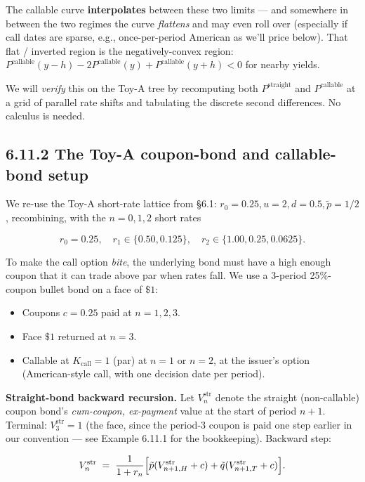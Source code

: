 \documentclass[
  10pt,
  twoside]{book}
\providecommand{\tightlist}{%
  \setlength{\itemsep}{0pt}\setlength{\parskip}{0pt}}
\begin{document}
The callable curve \textbf{interpolates} between these two limits ---
and somewhere in between the two regimes the curve \emph{flattens} and
may even roll over (especially if call dates are sparse, e.g.,
once-per-period American as we'll price below). That flat / inverted
region is the negatively-convex region:
\(P^{\text{callable}}(y - h) - 2 P^{\text{callable}}(y) + P^{\text{callable}}(y + h) < 0\)
for nearby yields.

We will \emph{verify} this on the Toy-A tree by recomputing both
\(P^{\text{straight}}\) and \(P^{\text{callable}}\) at a grid of
parallel rate shifts and tabulating the discrete second differences. No
calculus is needed.

\subsection{6.11.2 The Toy-A coupon-bond and callable-bond
setup}\label{the-toy-a-coupon-bond-and-callable-bond-setup}

We re-use the Toy-A short-rate lattice from §6.1:
\(r_0 = 0.25, u = 2, d = 0.5, \tilde p = 1/2\), recombining, with the
\(n=0,1,2\) short rates

\[r_0 = 0.25, \quad r_1 \in \{0.50, 0.125\}, \quad r_2 \in \{1.00, 0.25, 0.0625\}.\]

To make the call option \emph{bite}, the underlying bond must have a
high enough coupon that it can trade above par when rates fall. We use a
3-period 25\%-coupon bullet bond on a face of \(\$1\):

\begin{itemize}
\tightlist
\item
  Coupons \(c = 0.25\) paid at \(n = 1, 2, 3\).
\item
  Face \(\$1\) returned at \(n = 3\).
\item
  Callable at \(K_{\text{call}} = 1\) (par) at \(n = 1\) or \(n = 2\),
  at the issuer's option (American-style call, with one decision date
  per period).
\end{itemize}

\textbf{Straight-bond backward recursion.} Let \(V_n^{\text{str}}\)
denote the straight (non-callable) coupon bond's \emph{cum-coupon,
ex-payment} value at the start of period \(n+1\). Terminal:
\(V_3^{\text{str}} = 1\) (the face, since the period-\(3\) coupon is
paid one step earlier in our convention --- see Example 6.11.1 for the
bookkeeping). Backward step:

\[V_n^{\text{str}} \;=\; \frac{1}{1 + r_n}\Bigl[\tilde p (V_{n+1, H}^{\text{str}} + c) + \tilde q (V_{n+1, T}^{\text{str}} + c)\Bigr].\]
\end{document}
